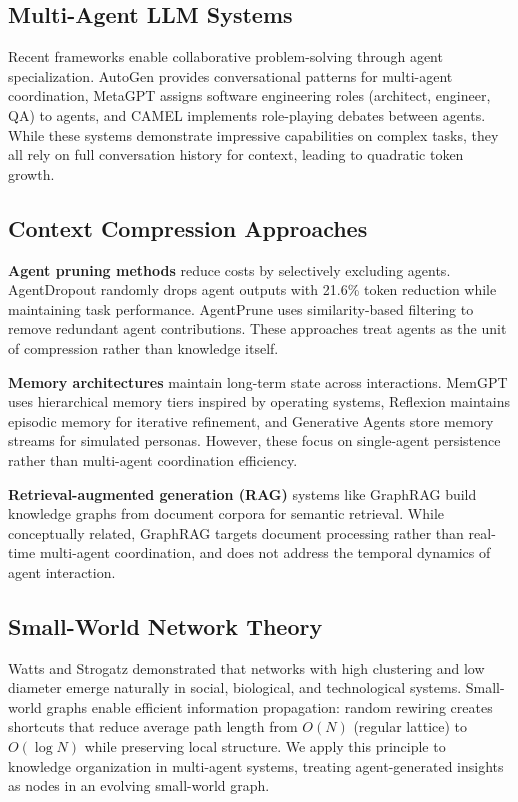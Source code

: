 \documentclass[11pt]{article}
\begin{document}
\subsection{Multi-Agent LLM Systems}

Recent frameworks enable collaborative problem-solving through agent specialization. AutoGen \cite{autogen} provides conversational patterns for multi-agent coordination, MetaGPT \cite{metagpt} assigns software engineering roles (architect, engineer, QA) to agents, and CAMEL \cite{camel} implements role-playing debates between agents. While these systems demonstrate impressive capabilities on complex tasks, they all rely on full conversation history for context, leading to quadratic token growth.

\subsection{Context Compression Approaches}

\textbf{Agent pruning methods} reduce costs by selectively excluding agents. AgentDropout \cite{agentdropout} randomly drops agent outputs with 21.6\% token reduction while maintaining task performance. AgentPrune uses similarity-based filtering to remove redundant agent contributions. These approaches treat agents as the unit of compression rather than knowledge itself.

\textbf{Memory architectures} maintain long-term state across interactions. MemGPT \cite{memgpt} uses hierarchical memory tiers inspired by operating systems, Reflexion \cite{reflexion} maintains episodic memory for iterative refinement, and Generative Agents \cite{generativeagents} store memory streams for simulated personas. However, these focus on single-agent persistence rather than multi-agent coordination efficiency.

\textbf{Retrieval-augmented generation (RAG)} systems like GraphRAG \cite{graphrag} build knowledge graphs from document corpora for semantic retrieval. While conceptually related, GraphRAG targets document processing rather than real-time multi-agent coordination, and does not address the temporal dynamics of agent interaction.

\subsection{Small-World Network Theory}

Watts and Strogatz \cite{watts1998} demonstrated that networks with high clustering and low diameter emerge naturally in social, biological, and technological systems. Small-world graphs enable efficient information propagation: random rewiring creates shortcuts that reduce average path length from $O(N)$ (regular lattice) to $O(\log N)$ while preserving local structure. We apply this principle to knowledge organization in multi-agent systems, treating agent-generated insights as nodes in an evolving small-world graph.
\end{document}
